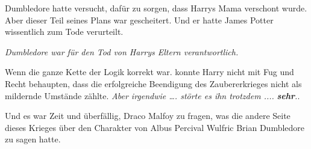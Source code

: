 Dumbledore hatte versucht, dafür zu sorgen, dass Harrys Mama verschont wurde.
Aber dieser Teil seines Plans war gescheitert. Und er hatte James Potter
wissentlich zum Tode verurteilt.

\emph{Dumbledore war für den Tod von Harrys Eltern verantwortlich.}

Wenn die ganze Kette der Logik korrekt war. konnte Harry nicht mit Fug und Recht
behaupten, dass die erfolgreiche Beendigung des Zaubererkrieges nicht als
mildernde Umstände zählte.  \emph{ Aber
irgendwie …. störte es ihn trotzdem ....} \textbf{\emph{sehr}}\emph{.}\grqq{}.

Und es war Zeit und überfällig, Draco Malfoy zu fragen, was die andere Seite
dieses Krieges über den Charakter von Albus Percival Wulfric Brian Dumbledore zu
sagen hatte.

